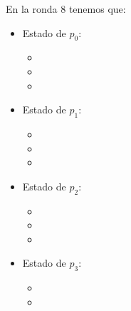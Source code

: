 En la ronda 8 tenemos que:

\begin{multicols}{2}
\begin{itemize}
\item Estado de $p_0$:
      \begin{itemize}
      \item {}
      
      \item {}
      
      \item {}
      \end{itemize}
      
\item Estado de $p_1$:
      \begin{itemize}
      \item {}
      
      \item {}
      
      \item {}
      \end{itemize}

\item Estado de $p_2$:
      \begin{itemize}
      \item {}
      
      \item {}
      
      \item {}
      \end{itemize}

\item Estado de $p_3$:
      \begin{itemize}
      \item {}
      
      \item {}
      

\end{itemize}
\end{itemize}
\end{multicols}
